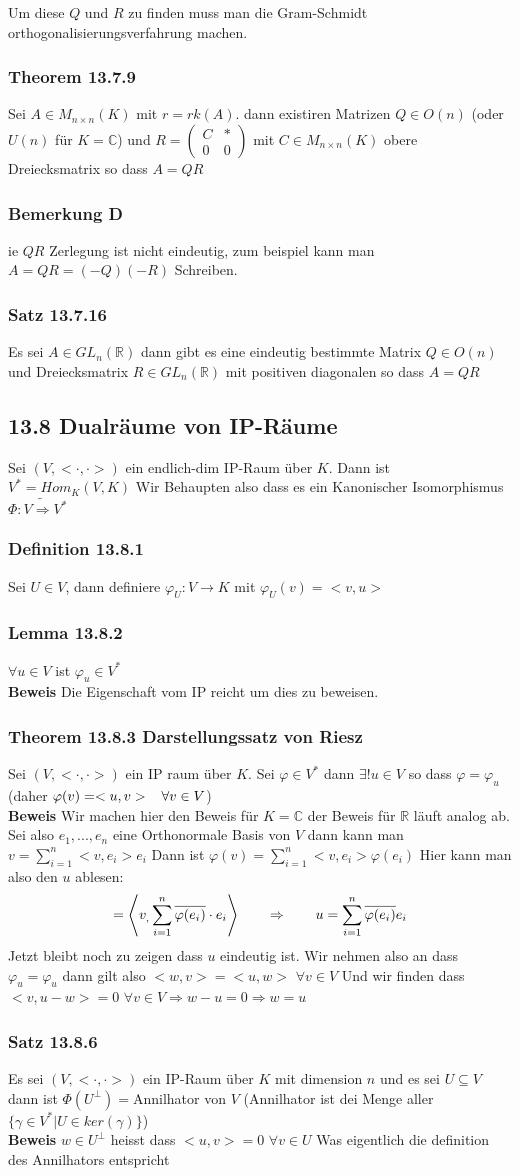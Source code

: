 \documentclass{article}
\newcommand{\mspc}{\hspace{0.7cm}}
\newcommand{\smspc}{\hspace{0.3cm}}
\newcommand{\satz}[1]{\subsubsection*{Satz {#1}}}
\newcommand{\beweis}{\\\textbf{Beweis }}
\newcommand{\bemerkung}[1]{\subsubsection*{Bemerkung {#1}}}
\newcommand{\theorem}[1]{\subsubsection*{Theorem {#1}}}
\newcommand{\lemma}[1]{\subsubsection*{Lemma {#1}}}
\newcommand{\definition}[1]{\subsubsection*{Definition {#1}}}
\begin{document}
Um diese $Q$ und $R$ zu finden muss man die Gram-Schmidt orthogonalisierungsverfahrung machen.
\theorem{13.7.9} Sei $A\in M_{n\times n}(K)$ mit $r=rk(A)$. dann existiren Matrizen $Q\in O(n)$ (oder $U(n)$ für $K=\mathbb{C}$) und $R=\begin{pmatrix}C&*\\0&0\end{pmatrix}$ mit $C\in M_{n\times n}(K)$ obere Dreiecksmatrix so dass $A=QR$
\bemerkung Die $QR$ Zerlegung ist nicht eindeutig, zum beispiel kann man $A=QR=(-Q)(-R)$ Schreiben.
\satz{13.7.16} Es sei $A\in GL_n(\mathbb{R})$ dann gibt es eine eindeutig bestimmte Matrix $Q\in O(n)$ und Dreiecksmatrix $R\in GL_n(\mathbb{R})$ mit positiven diagonalen so dass $A=QR$
\newpage
\subsection*{13.8 Dualräume von IP-Räume}
Sei $(V,<\cdot,\cdot>)$ ein endlich-dim IP-Raum über $K$. Dann ist $V^*=Hom_K(V,K)$
Wir Behaupten also dass es ein Kanonischer Isomorphismus $\Phi:V\tilde{\Rightarrow} V^*$
\definition{13.8.1} Sei $U\in V$, dann definiere $\varphi_U:V\rightarrow K$ mit $\varphi_U(v)=<v,u>$
\lemma{13.8.2} $\forall u\in V$ ist $\varphi_u\in V^*$ \beweis Die Eigenschaft vom IP reicht um dies zu beweisen.
\theorem{13.8.3 Darstellungssatz von Riesz} Sei $(V,<\cdot,\cdot>)$ ein IP raum über $K$. Sei $\varphi\in V^*$ dann
$\exists!u\in V$ so dass $\varphi=\varphi_u$ (daher $\varphi(v)=<u,v>\smspc\forall v\in V$)
\beweis Wir machen hier den Beweis für $K=\mathbb{C}$ der Beweis für $\mathbb{R}$ läuft analog ab. Sei also $e_1,...,e_n$ eine Orthonormale Basis von $V$ dann kann man 
$v=\sum_{i=1}^n<v,e_i>e_i$ Dann ist $\varphi(v)=\sum_{i=1}^n<v,e_i>\varphi(e_i)$ Hier kann man also den $u$ ablesen:
\[=\left<v_,\sum_{i=1}^n\overline{\varphi(e_i)}\cdot e_i\right>\mspc\Rightarrow\mspc u=\sum_{i=1}^n\overline{\varphi(e_i)}e_i\]
Jetzt bleibt noch zu zeigen dass $u$ eindeutig ist. Wir nehmen also an dass $\varphi_u=\varphi_u$ dann gilt also $<w,v>=<u,w>$ $\forall v\in V$ Und wir finden dass $<v,u-w>=0$ $\forall v\in V\Rightarrow w-u=0\Rightarrow w=u$
\satz{13.8.6} Es sei $(V,<\cdot,\cdot>)$ ein IP-Raum über $K$ mit dimension $n$ und es sei $U\subseteq V$ dann ist $\Phi(U^\perp)=$Annilhator von $V$ (Annilhator ist dei Menge aller $\lbrace \gamma\in V^*|U\in ker(\gamma)\rbrace$)
\beweis $w\in U^\perp$ heisst dass $<u,v>=0$ $\forall v\in U$ Was eigentlich die definition des Annilhators entspricht
\end{document}
